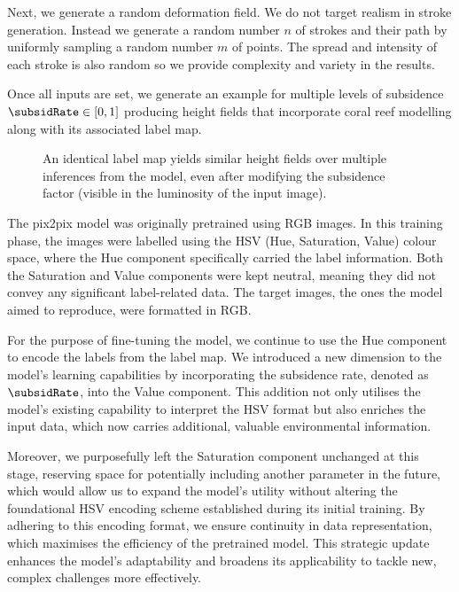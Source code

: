 Next, we generate a random deformation field. We do not target realism in stroke generation. Instead we generate a random number $n$ of strokes and their path by uniformly sampling a random number $m$ of points. The spread and intensity of each stroke is also random so we provide complexity and variety in the results. %

Once all inputs are set, we generate an example for multiple levels of subsidence $\subsidRate \in [0, 1]$ producing height fields that incorporate coral reef modelling along with its associated label map.

\begin{figure}
    \caption{An identical label map yields similar height fields over multiple inferences from the model, even after modifying the subsidence factor (visible in the luminosity of the input image).}
    \label{fig:coral-island-results-subsidence}
\end{figure}

The pix2pix model was originally pretrained using RGB images. In this training phase, the images were labelled using the HSV (Hue, Saturation, Value) colour space, where the Hue component specifically carried the label information. Both the Saturation and Value components were kept neutral, meaning they did not convey any significant label-related data. The target images, the ones the model aimed to reproduce, were formatted in RGB.

For the purpose of fine-tuning the model, we continue to use the Hue component to encode the labels from the label map. We introduced a new dimension to the model's learning capabilities by incorporating the subsidence rate, denoted as $\subsidRate$, into the Value component. This addition not only utilises the model's existing capability to interpret the HSV format but also enriches the input data, which now carries additional, valuable environmental information.

Moreover, we purposefully left the Saturation component unchanged at this stage, reserving space for potentially including another parameter in the future, which would allow us to expand the model's utility without altering the foundational HSV encoding scheme established during its initial training. By adhering to this encoding format, we ensure continuity in data representation, which maximises the efficiency of the pretrained model. This strategic update enhances the model's adaptability and broadens its applicability to tackle new, complex challenges more effectively.

